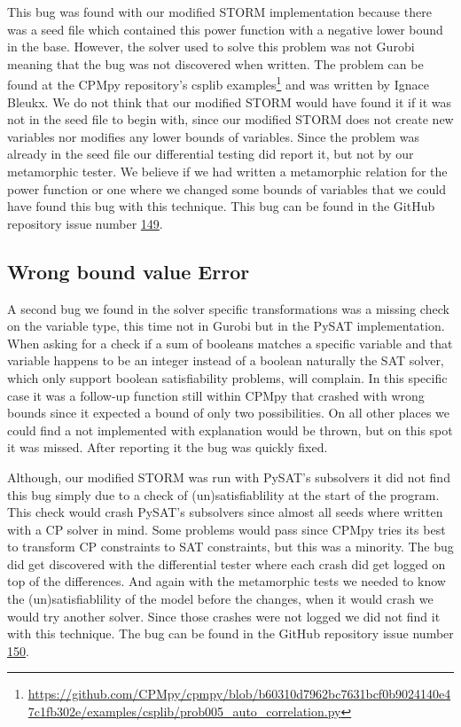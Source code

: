 This bug was found with our modified STORM implementation because there was a seed file which contained this power function with a negative lower bound in the base. However, the solver used to solve this problem was not Gurobi meaning that the bug was not discovered when written. The problem can be found at the CPMpy repository's csplib examples\footnote{\url{https://github.com/CPMpy/cpmpy/blob/b60310d7962bc7631bcf0b9024140e47c1fb302e/examples/csplib/prob005_auto_correlation.py}} and was written by Ignace Bleukx. We do not think that our modified STORM would have found it if it was not in the seed file to begin with, since our modified STORM does not create new variables nor modifies any lower bounds of variables. Since the problem was already in the seed file our differential testing did report it, but not by our metamorphic tester. We believe if we had written a metamorphic relation for the power function or one where we changed some bounds of variables that we could have found this bug with this technique. This bug can be found in the GitHub repository issue number \href{https://github.com/CPMpy/cpmpy/issues/149}{149}.

\subsection{Wrong bound value Error}
\label{res:bug:WrongBounds}
A second bug we found in the solver specific transformations was a missing check on the variable type, this time not in Gurobi but in the PySAT implementation. When asking for a check if a sum of booleans matches a specific variable and that variable happens to be an integer instead of a boolean naturally the SAT solver, which only support boolean satisfiability problems, will complain. In this specific case it was a follow-up function still within CPMpy that crashed with wrong bounds since it expected a bound of only two possibilities. On all other places we could find a not implemented with explanation would be thrown, but on this spot it was missed. After reporting it the bug was quickly fixed.

Although, our modified STORM was run with PySAT's subsolvers it did not find this bug simply due to a check of (un)satisfiablility at the start of the program. This check would crash PySAT's subsolvers since almost all seeds where written with a CP solver in mind. Some problems would pass since CPMpy tries its best to transform CP constraints to SAT constraints, but this was a minority. The bug did get discovered with the differential tester where each crash did get logged on top of the differences. And again with the metamorphic tests we needed to know the (un)satisfiablility of the model before the changes, when it would crash we would try another solver. Since those crashes were not logged we did not find it with this technique. The bug can be found in the GitHub repository issue number \href{https://github.com/CPMpy/cpmpy/issues/150}{150}.

